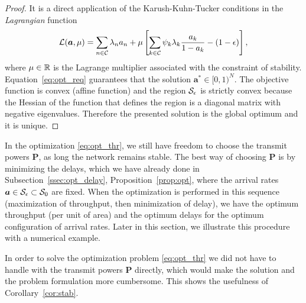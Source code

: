 \begin{proof}
	It is a direct application of the Karush-Kuhn-Tucker conditions \cite[Section~3.3.1]{bertsekas1999nonlinear} in the \emph{Lagrangian} function
    \begin{align*}
    	\cal{L}(\bm{a},\mu) = \sum_{n\in\cal{C}} \lambda_n a_n + \mu \left[ \sum_{k\in\cal{C}}\psi_k\lambda_k\frac{a_k}{1-a_k} - (1-\epsilon)\right],
    \end{align*}
    where $\mu\in\R$ is the Lagrange multiplier associated with the constraint of stability. Equation~\eqref{eq:opt_req} guarantees that the solution $\bm{a}^*\in[0,1)^N$.
    The objective function is convex (affine function) and the region $\cal{S}_\epsilon$ is strictly convex because the Hessian of the function that defines the region is a diagonal matrix with negative eigenvalues. Therefore the presented solution is the global optimum and it is unique.
\end{proof}

In the optimization \eqref{eq:opt_thr}, we still have freedom to choose the transmit powers $\bm{P}$, as long the network remains stable. The best way of choosing $\bm{P}$ is by minimizing the delays, which we have already done in Subsection~\ref{ssec:opt_delay}, Proposition~\ref{prop:opt}, where the arrival rates $\bm{a} \in \cal{S}_\epsilon \subset \cal{S}_0$ are fixed. When the optimization is performed in this sequence (maximization of throughput, then minimization of delay), we have the optimum throughput (per unit of area) and the optimum delays for the optimum configuration of arrival rates.
Later in this section, we illustrate this procedure with a numerical example.

In order to solve the optimization problem \eqref{eq:opt_thr} we did not have to handle with the transmit powers $\bm{P}$ directly, which would make the solution and the problem formulation more cumbersome. This shows the usefulness of Corollary~\ref{cor:stab}.

